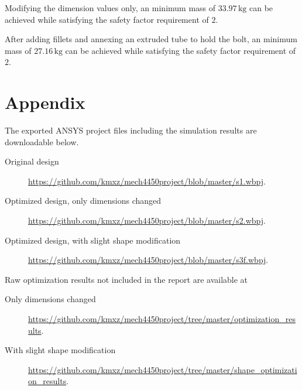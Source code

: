 \documentclass[a4paper,14pt]{extarticle}
\newcommand{\kg}{\,\si{\kilo\gram}}
\begin{document}
Modifying the dimension values only, an minimum mass of $33.97\kg$ can be achieved while satisfying the safety factor requirement of $2$. 

After adding fillets and annexing an extruded tube to hold the bolt, an minimum mass of $27.16\kg$ can be achieved while satisfying the safety factor requirement of $2$. 
\section{Appendix}
The exported ANSYS project files including the simulation results are downloadable below. 
\begin{description}
\item[Original design] \url{https://github.com/kmxz/mech4450project/blob/master/s1.wbpj}.
\item[Optimized design, only dimensions changed] \url{https://github.com/kmxz/mech4450project/blob/master/s2.wbpj}.
\item[Optimized design, with slight shape modification] \url{https://github.com/kmxz/mech4450project/blob/master/s3f.wbpj}.
\end{description}

Raw optimization results not included in the report are available at
\begin{description}
\item[Only dimensions changed] \url{https://github.com/kmxz/mech4450project/tree/master/optimization_results}.
\item[With slight shape modification] \url{https://github.com/kmxz/mech4450project/tree/master/shape_optimization_results}.
\end{description}
\end{document}
